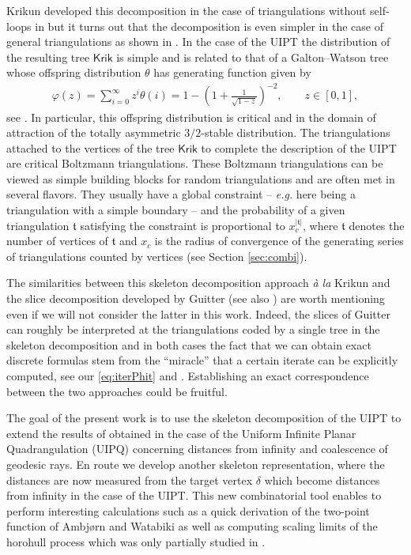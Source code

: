 \documentclass[10pt]{amsart}
\theoremstyle{definition}\newtheorem{defi}[theo]{Definition}\newtheorem{rema}[theo]{Remark}\newtheorem{exam}[theo]{Example}\newtheorem{exem}[theo]{Example}\newtheorem{nota}[theo]{Notation}
\begin{document}
Krikun developed this decomposition in the case of triangulations without self-loops  in \cite{Kr} but it turns out that the decomposition is even simpler in the case of general triangulations as shown in \cite{CLGfpp}. In the case of the UIPT the distribution of the resulting tree $ \mathsf{Krik}$ is simple and is related to that of a Galton--Watson tree whose  offspring distribution $\theta$ has generating function given by
 \begin{eqnarray} \varphi(z)= \sum_{i=0}^\infty z^i \theta(i) = 1 - \left( 1+ \frac{1}{ \sqrt{1-z}}\right)^{-2}, \qquad z \in [0,1] \label{eq:offspring},  \end{eqnarray}
see \cite{CLGfpp,M}. In particular, this offspring distribution is critical and in the domain of attraction of the totally asymmetric $3/2$-stable distribution. The triangulations attached to the vertices of the tree $ \mathsf{Krik}$ to complete the description of the UIPT are critical Boltzmann triangulations. These Boltzmann triangulations can be viewed as simple building blocks for random triangulations and are often met in several flavors. They usually have a global constraint -- \emph{e.g.} here being a triangulation with a simple boundary -- and the probability of a given triangulation $\mathfrak t$ satisfying the constraint is proportional to $x_c^{|\mathfrak t|}$, where $\mathfrak t$ denotes the number of vertices of $\mathfrak t$ and $x_c$ is the radius of convergence of the generating series of triangulations counted by vertices (see Section \ref{sec:combi}).

The similarities between this skeleton decomposition approach \emph{\`a la} Krikun and the slice decomposition developed by Guitter \cite{G17} (see also \cite[Appendix A]{BG12}) are worth mentioning even if we will not consider the latter in this work. Indeed, the slices of Guitter can roughly be interpreted at the triangulations coded by a single tree in the skeleton decomposition and in both cases the fact that we can obtain exact discrete formulas stem from the ``miracle'' that a certain iterate can be explicitly computed, see our \eqref{eq:iterPhit} and \cite[Eq (3)]{G17}. Establishing an exact correspondence between the two approaches could be fruitful.

\medskip

The goal of the present work is to use the skeleton decomposition of the UIPT to extend the results of \cite{CMM10} obtained in the case of the Uniform Infinite Planar Quadrangulation (UIPQ) concerning distances from infinity and coalescence of geodesic rays. En route we develop another skeleton representation, where the distances are now measured from the target vertex $\delta$ which become distances from infinity in the case of the UIPT. This new combinatorial tool enables to perform interesting calculations such as a quick derivation of the two-point function of Ambj\o rn and Watabiki \cite{ADJ}  as well as computing  scaling limits of the horohull process which was only partially studied in \cite{CMM10}.
\end{document}
